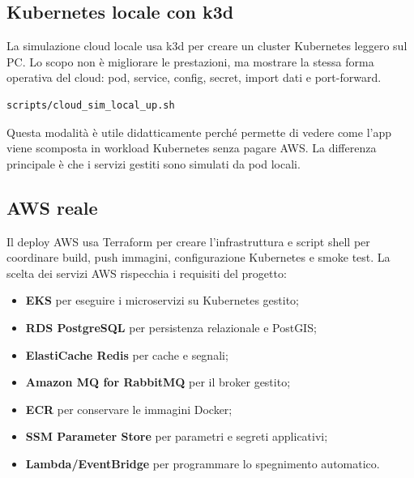 \documentclass[11pt,a4paper]{article}
\begin{document}
\subsection{Kubernetes locale con k3d}

La simulazione cloud locale usa k3d per creare un cluster Kubernetes leggero sul PC. Lo scopo non \`e migliorare le prestazioni, ma mostrare la stessa forma operativa del cloud: pod, service, config, secret, import dati e port-forward.

\begin{lstlisting}[language=bash]
scripts/cloud_sim_local_up.sh
\end{lstlisting}

Questa modalit\`a \`e utile didatticamente perch\'e permette di vedere come l'app viene scomposta in workload Kubernetes senza pagare AWS. La differenza principale \`e che i servizi gestiti sono simulati da pod locali.

\subsection{AWS reale}

Il deploy AWS usa Terraform per creare l'infrastruttura e script shell per coordinare build, push immagini, configurazione Kubernetes e smoke test. La scelta dei servizi AWS rispecchia i requisiti del progetto:

\begin{itemize}
  \item \textbf{EKS} per eseguire i microservizi su Kubernetes gestito;
  \item \textbf{RDS PostgreSQL} per persistenza relazionale e PostGIS;
  \item \textbf{ElastiCache Redis} per cache e segnali;
  \item \textbf{Amazon MQ for RabbitMQ} per il broker gestito;
  \item \textbf{ECR} per conservare le immagini Docker;
  \item \textbf{SSM Parameter Store} per parametri e segreti applicativi;
  \item \textbf{Lambda/EventBridge} per programmare lo spegnimento automatico.
\end{itemize}
\end{document}
